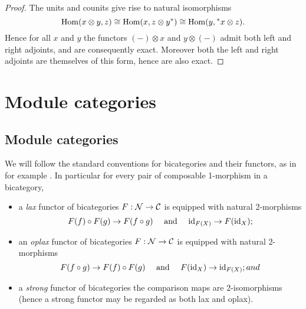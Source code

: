 \documentclass{amsart}
\begin{document}
\begin{proof}
	The units and counits give rise to natural isomorphisms
 \begin{equation*} 
 	\operatorname{Hom}(x \otimes y, z) \cong \operatorname{Hom}( x, z \otimes y^*) \cong \operatorname{Hom}(y, {}^*x \otimes z).
 \end{equation*}
	Hence for all $x$ and $y$ the functors $(-)\otimes x$ and $y \otimes (-)$ admit both left and right adjoints, and are consequently exact. Moreover both the left and right adjoints are themselves of this form, hence are also  exact. 
\end{proof}




\section{Module categories} \label{sec:tc-bimod}

\subsection{Module categories} %

We will follow the standard conventions for bicategories and their functors, as in for example \cite{MR2664622}. In particular for every pair of composable 1-morphism in a bicategory, 
\begin{itemize}
	\item a {\em lax} functor of bicategories $F: \mathcal N \to \mathcal C$ is equipped with natural 2-morphisms
	\begin{equation*}
		F(f) \circ F(g) \to F(f \circ g) \quad \textrm{ and } \quad \mathrm{id}_{F(X)} \to F(\mathrm{id}_X);
	\end{equation*} 
	\item an {\em oplax} functor of bicategories $F: \mathcal N \to \mathcal C$ is equipped with natural 2-morphisms
	\begin{equation*}
		F(f \circ g) \to F(f) \circ F(g)   \quad \textrm{ and } \quad F(\mathrm{id}_X) \to \mathrm{id}_{F(X)}; and
	\end{equation*}
	\item a {\em strong} functor of bicategories the comparison maps are 2-isomorphisms (hence a strong functor may be regarded as both lax and oplax). 
\end{itemize}
\end{document}
